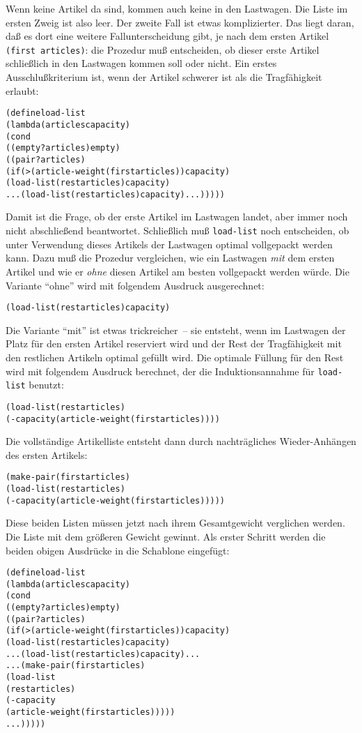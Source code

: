 %
Wenn keine Artikel da sind, kommen
auch keine in den Lastwagen.  Die Liste im ersten Zweig ist also leer.  Der
zweite Fall ist etwas komplizierter.
Das liegt daran, daß es dort
eine weitere Fallunterscheidung gibt, je nach dem ersten Artikel
\texttt{(first articles)}:
die Prozedur muß entscheiden, ob dieser erste
Artikel schließlich in den Lastwagen kommen soll oder nicht.
Ein erstes Ausschlußkriterium ist, wenn der Artikel schwerer ist als die
Tragfähigkeit erlaubt:
%
\begin{alltt}
(define load-list
  (lambda (articles capacity)
    (cond
     ((empty? articles) empty)
     ((pair? articles)
        (if (> (article-weight (first articles)) capacity)
            (load-list (rest articles) capacity)
            ... (load-list (rest articles) capacity) ...)))))
\end{alltt}
%
Damit ist die Frage, ob der erste Artikel im Lastwagen landet, aber immer
noch nicht abschließend beantwortet.  Schließlich muß
\texttt{load-list} noch entscheiden, ob unter Verwendung dieses
Artikels der Lastwagen optimal vollgepackt werden
kann.  Dazu muß die Prozedur vergleichen, wie ein Lastwagen \emph{mit}
dem ersten Artikel und wie er \emph{ohne} diesen Artikel am besten
vollgepackt werden würde.   Die Variante "`ohne"' wird mit folgendem
Ausdruck ausgerechnet:
%
\begin{alltt}
  (load-list (rest articles) capacity)
\end{alltt}
%
Die Variante "`mit"' ist etwas trickreicher~-- sie entsteht, wenn im
Lastwagen der Platz für den ersten Artikel reserviert wird und
der Rest der Tragfähigkeit mit den restlichen Artikeln optimal gefüllt wird.
Die optimale Füllung für den Rest wird mit folgendem Ausdruck
berechnet, der die Induktionsannahme für \texttt{load-list} benutzt:
%
\begin{alltt}
  (load-list (rest articles) 
                 (- capacity (article-weight (first articles))))
\end{alltt}
%
Die vollständige Artikelliste entsteht dann durch nachträgliches
Wieder-Anhängen des ersten Artikels:
%
\begin{alltt}
  (make-pair (first articles)
             (load-list (rest articles)
                            (- capacity (article-weight (first articles)))))
\end{alltt}
%
Diese beiden Listen müssen jetzt nach ihrem Gesamtgewicht verglichen
werden.  Die Liste mit dem größeren Gewicht gewinnt.  Als erster
Schritt werden die beiden obigen Ausdrücke in die Schablone eingefügt:
%
\begin{alltt}
(define load-list
  (lambda (articles capacity)
    (cond
     ((empty? articles) empty)
     ((pair? articles)
        (if (> (article-weight (first articles)) capacity)
            (load-list (rest articles) capacity)
            ... (load-list (rest articles) capacity) ...
            ... (make-pair (first articles)
                           (load-list
                             (rest articles)
                             (- capacity
                                (article-weight (first articles)))))
            ...)))))
\end{alltt}
